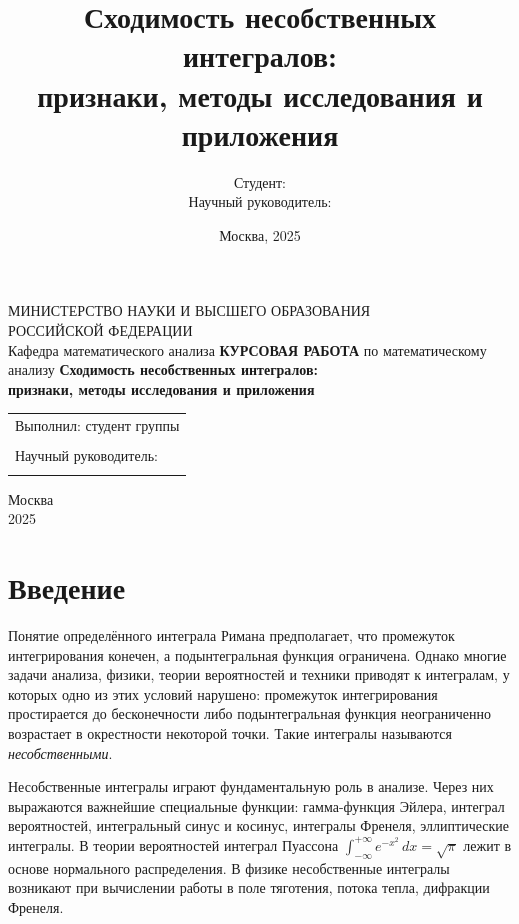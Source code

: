 \documentclass[12pt,a4paper]{article}
\title{Сходимость несобственных интегралов:\\ признаки, методы исследования и приложения}
\author{Студент: \underline{\hspace{5cm}}\\ Научный руководитель: \underline{\hspace{5cm}}}
\date{Москва, 2025}
\theoremstyle{definition}
\begin{document}
\begin{titlepage}
\centering
{\large МИНИСТЕРСТВО НАУКИ И ВЫСШЕГО ОБРАЗОВАНИЯ\\ РОССИЙСКОЙ ФЕДЕРАЦИИ}
\vspace{1cm}
{\large \underline{\hspace{10cm}}\\ Кафедра математического анализа}
\vspace{3cm}
{\Large\bfseries КУРСОВАЯ РАБОТА}
\vspace{0.7cm}
{\large по математическому анализу}
\vspace{1.5cm}
{\Large\bfseries Сходимость несобственных интегралов:\\ признаки, методы исследования и приложения}
\vspace{3cm}
\begin{flushright}
\begin{tabular}{l}
Выполнил: студент группы \underline{\hspace{2cm}}\\
\underline{\hspace{5cm}}\\[0.3cm]
Научный руководитель:\\
\underline{\hspace{5cm}}
\end{tabular}
\end{flushright}
\vfill
{\large Москва\\ 2025}
\end{titlepage}

\tableofcontents
\newpage

\section*{Введение}

Понятие определённого интеграла Римана предполагает, что промежуток интегрирования конечен, а подынтегральная функция ограничена. Однако многие задачи анализа, физики, теории вероятностей и техники приводят к интегралам, у которых одно из этих условий нарушено: промежуток интегрирования простирается до бесконечности либо подынтегральная функция неограниченно возрастает в окрестности некоторой точки. Такие интегралы называются \emph{несобственными}.

Несобственные интегралы играют фундаментальную роль в анализе. Через них выражаются важнейшие специальные функции: гамма-функция Эйлера, интеграл вероятностей, интегральный синус и косинус, интегралы Френеля, эллиптические интегралы. В теории вероятностей интеграл Пуассона $\int_{-\infty}^{+\infty} e^{-x^2}\,dx = \sqrt{\pi}$ лежит в основе нормального распределения. В физике несобственные интегралы возникают при вычислении работы в поле тяготения, потока тепла, дифракции Френеля.
\end{document}
